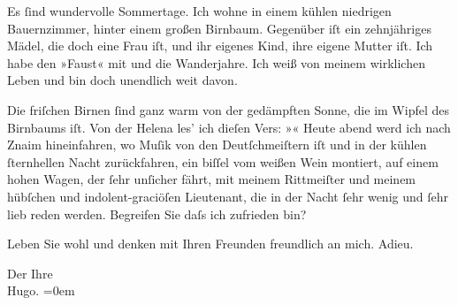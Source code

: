 \pstart
           Es ſind wundervolle Sommertage. Ich wohne in einem kühlen niedrigen Bauernzimmer,
               hinter einem großen Birnbaum. Gegenüber iſt ein zehnjähriges Mädel, die doch eine
               Frau iſt, und ihr eigenes Kind, ihre eigene Mutter iſt. Ich habe den »Faust« mit und die Wanderjahre. Ich weiß von meinem {\pb}wirklichen Leben und bin doch
               unendlich weit davon.\pend
           
\pstart
           Die friſchen Birnen ſind ganz warm von der gedämpften Sonne, die im Wipfel des
               Birnbaums iſt. Von der Helena les’ ich dieſen
               Vers: »\label{K_L00476-2v}\label{K_L00476-2}« Heute abend werd ich nach Znaim hineinfahren, wo Muſik von den Deutſchmeiſtern iſt und in der kühlen ſternhellen Nacht zurückfahren, ein
               biſſel vom weißen Wein montiert, auf einem hohen Wagen, der ſehr {\pb}unſicher fährt, mit meinem
               Rittmeiſter und meinem hübſchen und indolent-graciöſen Lieutenant, die in der Nacht
               ſehr wenig und ſehr lieb reden werden. Begreifen Sie daſs ich zufrieden bin?\pend
           
\pstart
           Leben Sie wohl und denken mit Ihren Freunden freundlich an mich. Adieu.\pend
           
\pstart
           Der Ihre{\\[\baselineskip]}\spacefill\mbox{Hugo.}\pend
           \leftskip=0em{}\endnumbering{}  
      